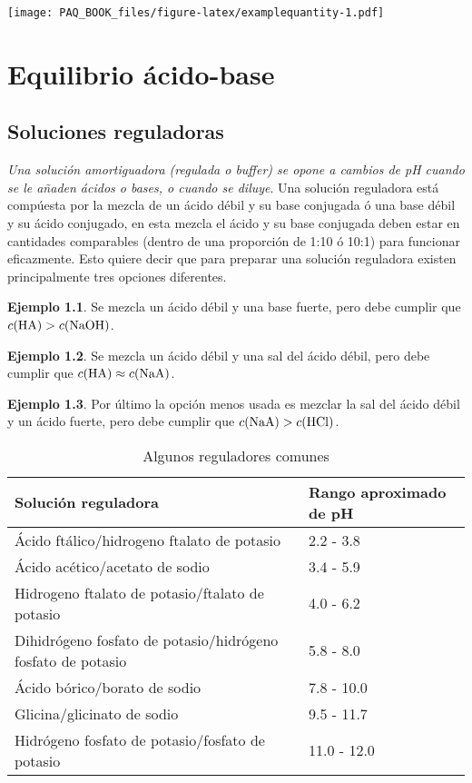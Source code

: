 \documentclass[
]{book}
\theoremstyle{definition}
\theoremstyle{definition}
\newtheorem{example}{Ejemplo}[chapter]
\theoremstyle{definition}
\theoremstyle{definition}
\theoremstyle{remark}
\begin{document}
\texttt{[image: PAQ\_BOOK\_files/figure-latex/examplequantity-1.pdf]}

\hypertarget{equilibrio-uxe1cido-base}{%
\chapter{Equilibrio ácido-base}\label{equilibrio-uxe1cido-base}}

\hypertarget{soluciones-reguladoras}{%
\section{Soluciones reguladoras}\label{soluciones-reguladoras}}

\emph{Una solución amortiguadora (regulada o buffer) se opone a cambios de pH cuando se le añaden ácidos o bases, o cuando se diluye}. Una solución reguladora está compúesta por la mezcla de un ácido débil y su base conjugada ó una base débil y su ácido conjugado, en esta mezcla el ácido y su base conjugada deben estar en cantidades comparables (dentro de una proporción de 1:10 ó 10:1) para funcionar eficazmente. Esto quiere decir que para preparar una solución reguladora existen principalmente tres opciones diferentes.

\begin{example}
Se mezcla un ácido débil y una base fuerte, pero debe cumplir que \(c(\ce{HA}) > c(\ce{NaOH})\).
\end{example}

\begin{example}
Se mezcla un ácido débil y una sal del ácido débil, pero debe cumplir que \(c(\ce{HA}) \approx c(\ce{NaA})\).
\end{example}

\begin{example}
Por último la opción menos usada es mezclar la sal del ácido débil y un ácido fuerte, pero debe cumplir que \(c(\ce{NaA}) > c(\ce{HCl})\).
\end{example}

\begin{table}

\caption{\label{tab:tables-common-buffers}Algunos reguladores comunes}
\centering
\begin{tabular}[t]{l|l}
\hline
Solución reguladora & Rango aproximado de pH\\
\hline
Ácido ftálico/hidrogeno ftalato de potasio & 2.2 - 3.8\\
\hline
Ácido acético/acetato de sodio & 3.4 - 5.9\\
\hline
Hidrogeno ftalato de potasio/ftalato de potasio & 4.0 - 6.2\\
\hline
Dihidrógeno fosfato de potasio/hidrógeno fosfato de potasio & 5.8 - 8.0\\
\hline
Ácido bórico/borato de sodio & 7.8 - 10.0\\
\hline
Glicina/glicinato de sodio & 9.5 - 11.7\\
\hline
Hidrógeno fosfato de potasio/fosfato de potasio & 11.0 - 12.0\\
\hline
\end{tabular}
\end{table}
\end{document}
